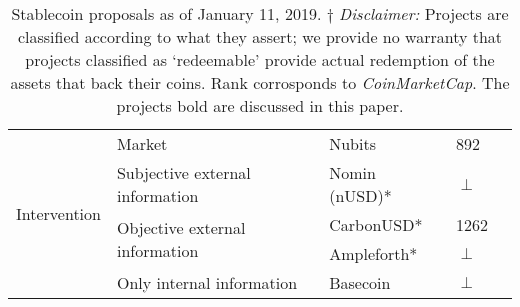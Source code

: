 \begin{table}[t]
\begin{tabular}{|l|l|l|l|l|}
                                                                                                                 
\multirow{5}{*}{Intervention}                                                           
						& \multirow{1}{*}{Market} 										& Nubits & 892 \\ \cline{2-4}
						& \multirow{1}{*}{Subjective external information}  		& Nomin (nUSD)* & $\perp$  \\ \cline{2-4}
						& \multirow{2}{*}{Objective external information}  		& CarbonUSD* & 1262 \\ \cline{3-4}
						&														& Ampleforth* & $\perp$ \\ \cline{2-4}
						& \multirow{1}{*}{Only internal information} 			& Basecoin & $\perp$ \\ \hline

\end{tabular}
\caption{Stablecoin proposals as of January 11, 2019. $\dagger$ \textit{Disclaimer:} Projects are classified according to what they assert; \eg we provide no warranty that projects classified as `redeemable' provide actual redemption of the assets that back their coins. Rank corrosponds to \textit{CoinMarketCap}. The projects bold are discussed in this paper.\label{tab:stablecoins}}
\end{table}
